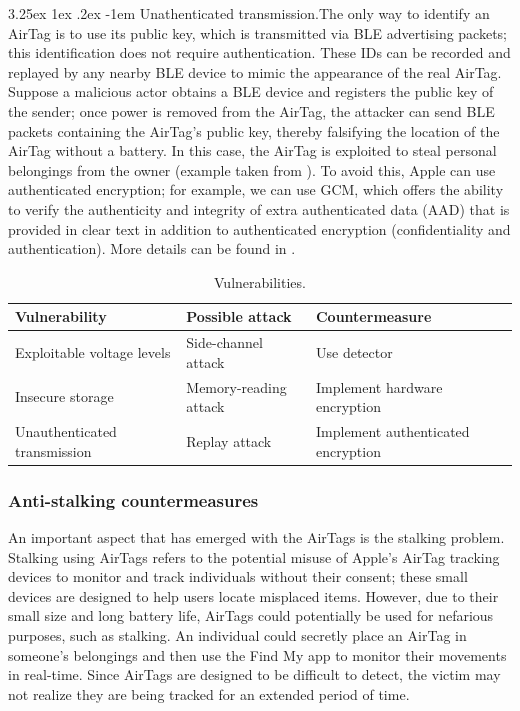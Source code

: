 \documentclass[english]{article}
\makeatletter
\renewcommand\paragraph{\@startsection{paragraph}{5}{\z@}%
  {3.25ex \@plus1ex \@minus.2ex}%
  {-1em}%
  {\normalfont\normalsize\bfseries}}
\makeatother
\begin{document}
\paragraph{Unathenticated transmission.}The only way to identify an AirTag is to use its public key, which is transmitted via BLE advertising packets; this identification does not require authentication. These IDs can be recorded and replayed by any nearby BLE device to mimic the appearance of the real AirTag. Suppose a malicious actor obtains a BLE device and registers the public key of the sender; once power is removed from the AirTag, the attacker can send BLE packets containing the AirTag's public key, thereby falsifying the location of the AirTag without a battery. In this case, the AirTag is exploited to steal personal belongings from the owner (example taken from \cite{reverse}). To avoid this, Apple can use authenticated encryption; for example, we can use GCM, which offers the ability to verify the authenticity and integrity of extra authenticated data (AAD) that is provided in clear text in addition to authenticated encryption (confidentiality and authentication). More details can be found in \cite{gcm}.

\begin{table}[h] 
  \caption{Vulnerabilities.}
  \centering
  \begin{tabularx}{\textwidth}{|X|X|X|}
    \hline
    \textbf{Vulnerability}      & \textbf{Possible attack} & \textbf{Countermeasure}             \\ \hline
    Exploitable voltage levels  & Side-channel attack      & Use detector         \\ \hline
    Insecure storage            & Memory-reading attack    & Implement hardware encryption \\ \hline
    Unauthenticated transmission & Replay attack            & Implement authenticated encryption                     \\ \hline
  \end{tabularx}
  \label{vuln}
\end{table}

\subsubsection{Anti-stalking countermeasures}\label{countermeasures}
An important aspect that has emerged with the AirTags is the stalking problem. Stalking using AirTags refers to the potential misuse of Apple's AirTag tracking devices to monitor and track individuals without their consent; these small devices are designed to help users locate misplaced items. However, due to their small size and long battery life, AirTags could potentially be used for nefarious purposes, such as stalking. An individual could secretly place an AirTag in someone's belongings and then use the Find My app to monitor their movements in real-time. Since AirTags are designed to be difficult to detect, the victim may not realize they are being tracked for an extended period of time.
\end{document}
